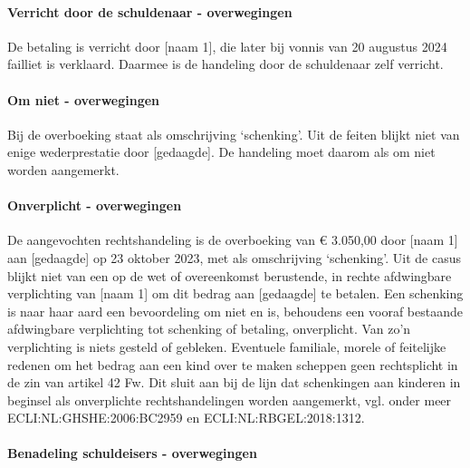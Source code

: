 \documentclass[
  dutch,
  a4paper,
]{article}
\begin{document}
\paragraph{Verricht door de schuldenaar - overwegingen}\label{verricht-door-de-schuldenaar---overwegingen-34}

De betaling is verricht door {[}naam 1{]}, die later bij vonnis van 20 augustus 2024 failliet is verklaard. Daarmee is de handeling door de schuldenaar zelf verricht.

\paragraph{Om niet - overwegingen}\label{om-niet---overwegingen-34}

Bij de overboeking staat als omschrijving `schenking'. Uit de feiten blijkt niet van enige wederprestatie door {[}gedaagde{]}. De handeling moet daarom als om niet worden aangemerkt.

\paragraph{Onverplicht - overwegingen}\label{onverplicht---overwegingen-34}

De aangevochten rechtshandeling is de overboeking van € 3.050,00 door {[}naam 1{]} aan {[}gedaagde{]} op 23 oktober 2023, met als omschrijving `schenking'. Uit de casus blijkt niet van een op de wet of overeenkomst berustende, in rechte afdwingbare verplichting van {[}naam 1{]} om dit bedrag aan {[}gedaagde{]} te betalen. Een schenking is naar haar aard een bevoordeling om niet en is, behoudens een vooraf bestaande afdwingbare verplichting tot schenking of betaling, onverplicht. Van zo'n verplichting is niets gesteld of gebleken. Eventuele familiale, morele of feitelijke redenen om het bedrag aan een kind over te maken scheppen geen rechtsplicht in de zin van artikel 42 Fw. Dit sluit aan bij de lijn dat schenkingen aan kinderen in beginsel als onverplichte rechtshandelingen worden aangemerkt, vgl. onder meer ECLI:NL:GHSHE:2006:BC2959 en ECLI:NL:RBGEL:2018:1312.

\paragraph{Benadeling schuldeisers - overwegingen}\label{benadeling-schuldeisers---overwegingen-34}
\end{document}
